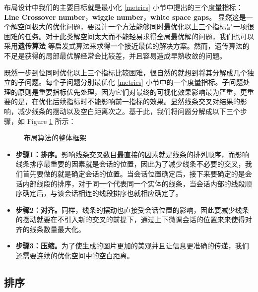 布局设计中我们的主要目标就是最小化 \ref{metrics} 小节中提出的三个度量指标：\textbf{Line Crossover number}，\textbf{wiggle number}，\textbf{white space gaps}。 显然这是一个解空间极大的优化问题，要设计一个方法能够同时最优化以上三个指标是一项很困难的任务。对于此类解空间太大而不能轻易求得全局最优解的问题，我们也可以采用\textbf{遗传算法}\cite{tanahashi2012design} 等启发式算法来求得一个接近最优的解决方案。然而，遗传算法的不足是获得的局部最优解经常会比较差，并且容易造成早熟收敛的问题。

既然一步到位同时优化以上三个指标比较困难，很自然的就想到将其分解成几个独立的子问题。每个子问题分别最优化 \ref{metrics} 小节中的一个度量指标。子问题处理的原则是重要指标优先处理，因为它们对最终的可视化效果影响最为严重，更重要的是，在优化后续指标时不能影响前一指标的效果。显然线条交叉对结果的影响，减少线条的摆动以及空白距离次之。基于此，我们将问题分解成以下三个步骤，如 Figure \ref{fig:layout-steps} 所示：
\begin{figure}[htb]
	\centering
	\caption{布局算法的整体框架}
	\label{fig:layout-steps}
\end{figure}

\begin{itemize}
\item \textbf{步骤1：排序。}影响线条交叉数目最直接的因素就是线条的排列顺序，而影响线条排序最重要的因素就是会话的位置，因此为了减少线条不必要的交叉，我们首先要做的就是确定会话的位置。当会话位置确定后，接下来要确定的是会话内部线段的排序，对于同一个代表同一个实体的线条，当会话内部的线段顺序确定后，与该会话相连的线段排序也就相应确定了。
\item \textbf{步骤2：对齐。}同样，线条的摆动也直接受会话位置的影响，因此要减少线条的摆动就要在不引入新的交叉的前提下，通过上下微调会话的位置来来使得对齐的线条数量最大化。
\item \textbf{步骤3：压缩。}为了使生成的图片更加的美观并且让信息更准确的传递，我们还需要连续的优化空间中的空白距离。
\end{itemize}

\subsection{排序}
